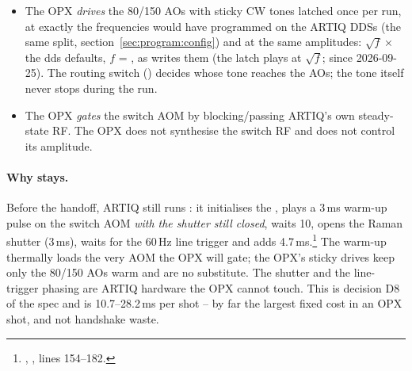 \begin{itemize}[nosep]
  \item The OPX \emph{drives} the 80/150 AOs with sticky CW tones latched
    once per run, at exactly the frequencies  would have
    programmed on the ARTIQ DDSs (the same 
    split, section~\ref{sec:program:config}) and at the same amplitudes:
    $\sqrt{f}\times$ the dds defaults, $f$ = , as
     writes them (the latch plays at
    $\sqrt{f}$\code{)}; since 2026-09-25). The routing switch
    () decides whose tone reaches the AOs; the tone itself never
    stops during the run.
  \item The OPX \emph{gates} the switch AOM by blocking/passing ARTIQ's own
    steady-state RF. The OPX does not synthesise the switch RF and does not
    control its amplitude.
\end{itemize}

\paragraph{Why  stays.} Before the handoff, ARTIQ still
runs : it initialises the , plays a
3\,ms warm-up pulse on the switch AOM \emph{with the shutter still closed},
waits 10\us, opens the Raman shutter (3\,ms), waits for the 60\,Hz line
trigger and adds 4.7\,ms.\footnote{,
, lines 154--182.} The warm-up thermally loads the very
AOM the OPX will gate; the OPX's sticky drives keep only the 80/150 AOs
warm and are no substitute. The shutter and the line-trigger phasing are
ARTIQ hardware the OPX cannot touch. This is decision D8 of the spec and is
10.7--28.2\,ms per shot -- by far the largest fixed cost in an OPX shot, and
not handshake waste.
